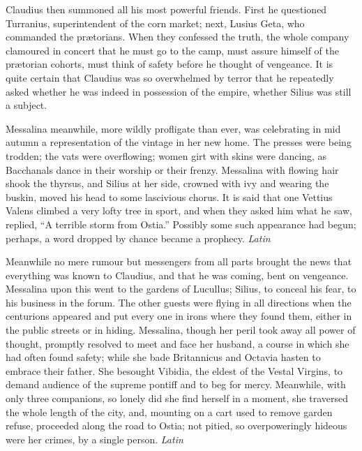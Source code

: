 
Claudius then summoned all his most powerful friends. First he questioned Turranius, superintendent of the corn market; next, Lusius Geta, who commanded the prætorians. When they confessed the truth, the whole company clamoured in concert that he must go to the camp, must assure himself of the prætorian cohorts, must think of safety before he thought of vengeance. It is quite certain that Claudius was so overwhelmed by terror that he repeatedly asked whether he was indeed in possession of the empire, whether Silius was still a subject.

Messalina meanwhile, more wildly profligate than ever, was celebrating in mid autumn a representation of the vintage in her new home. The presses were being trodden; the vats were overflowing; women girt with skins were dancing, as Bacchanals dance in their worship or their frenzy. Messalina with flowing hair shook the thyrsus, and Silius at her side, crowned with ivy and wearing the buskin, moved his head to some lascivious chorus. It is said that one Vettius Valens climbed a very lofty tree in sport, and when they asked him what he saw, replied, ``A terrible storm from Ostia.'' Possibly some such appearance had begun; perhaps, a word dropped by chance became a prophecy. \emph{Latin}


Meanwhile no mere rumour but messengers from all parts brought the news that everything was known to Claudius, and that he was coming, bent on vengeance. Messalina upon this went to the gardens of Lucullus; Silius, to conceal his fear, to his business in the forum. The other guests were flying in all directions when the centurions appeared and put every one in irons where they found them, either in the public streets or in hiding. Messalina, though her peril took away all power of thought, promptly resolved to meet and face her husband, a course in which she had often found safety; while she bade Britannicus and Octavia hasten to embrace their father. She besought Vibidia, the eldest of the Vestal Virgins, to demand audience of the supreme pontiff and to beg for mercy. Meanwhile, with only three companions, so lonely did she find herself in a moment, she traversed the whole length of the city, and, mounting on a cart used to remove garden refuse, proceeded along the road to Ostia; not pitied, so overpoweringly hideous were her crimes, by a single person. \emph{Latin}


